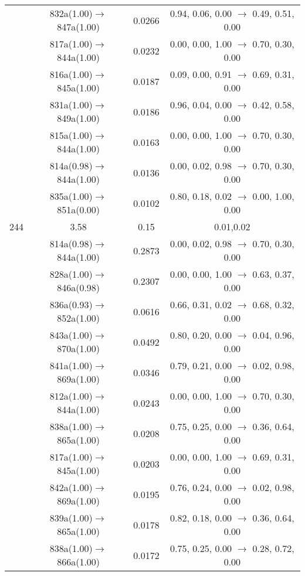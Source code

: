 \documentclass[10pt,a4paper]{article}
\begin{document}
\begin{longtable}{c|c|c|c}
 	& 832a(1.00)$\rightarrow$847a(1.00) &	 0.0266 &	 0.94, 0.06, 0.00 $\rightarrow$ 0.49, 0.51, 0.00 \\ 
 	& 817a(1.00)$\rightarrow$844a(1.00) &	 0.0232 &	 0.00, 0.00, 1.00 $\rightarrow$ 0.70, 0.30, 0.00 \\ 
 	& 816a(1.00)$\rightarrow$845a(1.00) &	 0.0187 &	 0.09, 0.00, 0.91 $\rightarrow$ 0.69, 0.31, 0.00 \\ 
 	& 831a(1.00)$\rightarrow$849a(1.00) &	 0.0186 &	 0.96, 0.04, 0.00 $\rightarrow$ 0.42, 0.58, 0.00 \\ 
 	& 815a(1.00)$\rightarrow$844a(1.00) &	 0.0163 &	 0.00, 0.00, 1.00 $\rightarrow$ 0.70, 0.30, 0.00 \\ 
 	& 814a(0.98)$\rightarrow$844a(1.00) &	 0.0136 &	 0.00, 0.02, 0.98 $\rightarrow$ 0.70, 0.30, 0.00 \\ 
 	& 835a(1.00)$\rightarrow$851a(0.00) &	 0.0102 &	 0.80, 0.18, 0.02 $\rightarrow$ 0.00, 1.00, 0.00 \\ 
 \hline244 &	 3.58 &	 0.15 &	 0.01,0.02 \\ 
  	& 814a(0.98)$\rightarrow$844a(1.00) &	 0.2873 &	 0.00, 0.02, 0.98 $\rightarrow$ 0.70, 0.30, 0.00 \\ 
 	& 828a(1.00)$\rightarrow$846a(0.98) &	 0.2307 &	 0.00, 0.00, 1.00 $\rightarrow$ 0.63, 0.37, 0.00 \\ 
 	& 836a(0.93)$\rightarrow$852a(1.00) &	 0.0616 &	 0.66, 0.31, 0.02 $\rightarrow$ 0.68, 0.32, 0.00 \\ 
 	& 843a(1.00)$\rightarrow$870a(1.00) &	 0.0492 &	 0.80, 0.20, 0.00 $\rightarrow$ 0.04, 0.96, 0.00 \\ 
 	& 841a(1.00)$\rightarrow$869a(1.00) &	 0.0346 &	 0.79, 0.21, 0.00 $\rightarrow$ 0.02, 0.98, 0.00 \\ 
 	& 812a(1.00)$\rightarrow$844a(1.00) &	 0.0243 &	 0.00, 0.00, 1.00 $\rightarrow$ 0.70, 0.30, 0.00 \\ 
 	& 838a(1.00)$\rightarrow$865a(1.00) &	 0.0208 &	 0.75, 0.25, 0.00 $\rightarrow$ 0.36, 0.64, 0.00 \\ 
 	& 817a(1.00)$\rightarrow$845a(1.00) &	 0.0203 &	 0.00, 0.00, 1.00 $\rightarrow$ 0.69, 0.31, 0.00 \\ 
 	& 842a(1.00)$\rightarrow$869a(1.00) &	 0.0195 &	 0.76, 0.24, 0.00 $\rightarrow$ 0.02, 0.98, 0.00 \\ 
 	& 839a(1.00)$\rightarrow$865a(1.00) &	 0.0178 &	 0.82, 0.18, 0.00 $\rightarrow$ 0.36, 0.64, 0.00 \\ 
 	& 838a(1.00)$\rightarrow$866a(1.00) &	 0.0172 &	 0.75, 0.25, 0.00 $\rightarrow$ 0.28, 0.72, 0.00 \\ 

\end{longtable}
\end{document}
